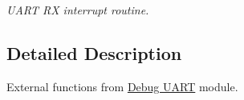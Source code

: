 \begin{DoxyCompactItemize}
\begin{DoxyCompactList}\small\item\em U\+A\+RT RX interrupt routine. \end{DoxyCompactList}\end{DoxyCompactItemize}


\subsection{Detailed Description}
External functions from \hyperlink{group___debug___uart}{Debug U\+A\+RT} module. 

